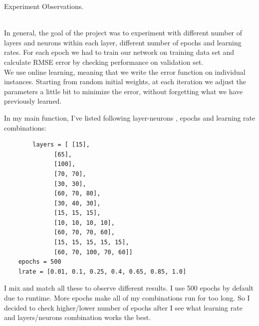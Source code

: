\documentclass[12pt, letterpaper]{article}
\begin{document}
\begin{enumerate}[label=\Roman*.]
	{\bf \item Experiment Observations. }\\
	
	In general, the goal of the project was to experiment with different number of layers and neurons within each layer, different number of epochs and learning rates. For each epoch we had to train our network on training data set and calculate RMSE error by checking performance on validation set. \\
	We use online learning, meaning that we write the error function on individual instances. Starting from random initial weights, at each iteration we adjust the parameters a little bit to minimize the error, without forgetting what we have previously learned.
	
	In my main function, I've listed following layer-neurons , epochs and learning rate combinations:
	\begin{verbatim}
	    layers = [ [15],
              [65],
              [100],
              [70, 70],
              [30, 30],
              [60, 70, 80],
              [30, 40, 30],
              [15, 15, 15],
              [10, 10, 10, 10],
              [60, 70, 70, 60],
              [15, 15, 15, 15, 15],
              [60, 70, 100, 70, 60]]
    epochs = 500
    lrate = [0.01, 0.1, 0.25, 0.4, 0.65, 0.85, 1.0]
	\end{verbatim}
	 I mix and match all these to observe different results. I use 500 epochs by default due to runtime. More epochs make all of my combinations run for too long. So I decided to check higher/lower number of epochs after I see what learning rate and layers/neurons combination works the best.\\
	 

\end{enumerate}
\end{document}
